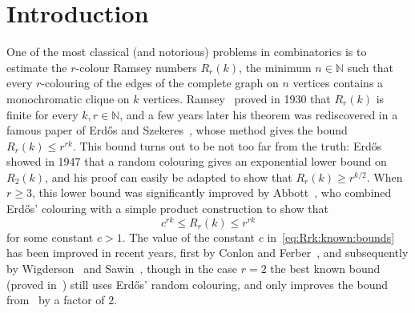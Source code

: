\documentclass[12pt,reqno]{amsart}
\theoremstyle{definition}
\theoremstyle{remark}
\newcommand\N{\mathbb{N}}
\renewcommand{\le}{\leqslant}
\renewcommand{\ge}{\geqslant}
\def\N{\mathbb{N}}
\begin{document}
\maketitle

\section{Introduction}

One of the most classical (and notorious) problems in combinatorics is to estimate the $r$-colour Ramsey numbers $R_r(k)$, the minimum $n \in \N$ such that every $r$-colouring of the edges of the complete graph on $n$ vertices contains a monochromatic clique on $k$ vertices. Ramsey~\cite{R30} proved in 1930 that $R_r(k)$ is finite for every $k,r \in \N$, and a few years later his theorem was rediscovered in a famous paper of Erd\H{o}s and Szekeres~\cite{ESz35}, whose method gives the bound $R_r(k) \le r^{rk}$. 
This bound turns out to be not too far from the truth: Erd\H{o}s~\cite{E47} showed in 1947 that a random colouring gives an exponential lower bound on $R_2(k)$,  
and his proof can easily be adapted to show that $R_r(k)\ge r^{k/2}$. When $r \ge 3$, this lower bound was significantly improved by Abbott~\cite{A72}, %
who combined Erd\H{o}s' colouring with a simple product construction to show that  
\begin{equation}\label{eq:Rrk:known:bounds}
c^{rk} \le R_r(k) \le r^{rk}
\end{equation}
for some constant $c > 1$. The value of the constant $c$ in~\eqref{eq:Rrk:known:bounds} has been improved in recent years, first by Conlon and Ferber~\cite{CF}, and subsequently by Wigderson~\cite{W} and Sawin~\cite{S}, though in the case $r = 2$ the best known bound (proved in~\cite{S77}) still uses Erd\H{o}s' random colouring, and only improves the bound from~\cite{E47} by a factor of $2$. 
\end{document}
